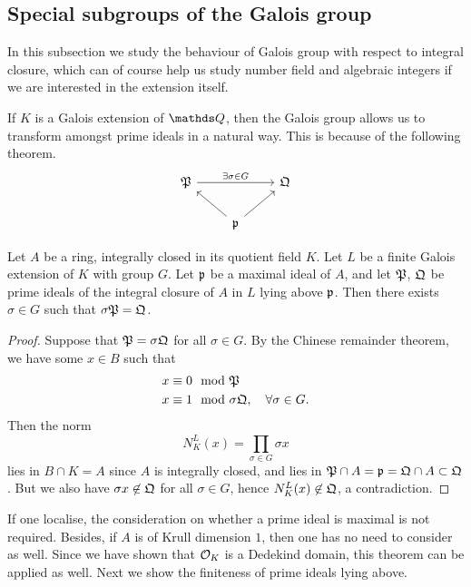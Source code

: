 		\subsection{Special subgroups of the Galois group}
			In this subsection we study the behaviour of Galois group with respect to integral closure, which can of course help us study number field and algebraic integers if we are interested in the extension itself.
		
			If $K$ is a Galois extension of $\Q$, then the Galois group allows us to transform amongst prime ideals in a natural way. This is because of the following theorem.
			\[
				\begin{tikzcd}
					\mathfrak{P} \arrow[rr, "\exists \sigma \in G"] &                                    & \mathfrak{Q} \\
					& \mathfrak{p} \arrow[lu] \arrow[ru] &             
				\end{tikzcd}
			\]
			\begin{theorem}\label{galois-lie-above}
				Let $A$ be a ring, integrally closed in its quotient field $K$. Let $L$ be a finite Galois extension of $K$ with group $G$. Let $\mathfrak{p}$ be a maximal ideal of $A$, and let $\mathfrak{P}$, $\mathfrak{Q}$ be prime ideals of the integral closure of $A$ in $L$ lying above $\mathfrak{p}$. Then there exists $\sigma \in G$ such that $\sigma\mathfrak{P} = \mathfrak{Q}$.
			\end{theorem}
			\begin{proof}
				Suppose that $\mathfrak{P}=\sigma\mathfrak{Q}$ for all $\sigma \in G$. By the Chinese remainder theorem, we have some $x \in B$ such that 
				\[
					\begin{aligned}
						x &\equiv 0 \mod {\mathfrak}{P} \\
						x &\equiv 1 \mod \sigma\mathfrak{Q}, \quad \forall \sigma \in G.
					\end{aligned}
				\]
				Then the norm
				\[
					N_K^L(x) = \prod_{\sigma \in G}\sigma{x}
				\]
				lies in $B \cap K = A$ since $A$ is integrally closed, and lies in $\mathfrak{P} \cap A = \mathfrak{p}=\mathfrak{Q} \cap A \subset \mathfrak{Q}$. But we also have $\sigma{x} \not\in \mathfrak{Q}$ for all $\sigma \in G$, hence $N_K^L(x) \not \in \mathfrak{Q}$, a contradiction.
			\end{proof}
			If one localise, the consideration on whether a prime ideal is maximal is not required. Besides, if $A$ is of Krull dimension $1$, then one has no need to consider as well. Since we have shown that $\mathcal{O}_K$ is a Dedekind domain, this theorem can be applied as well. Next we show the finiteness of prime ideals lying above.
			
